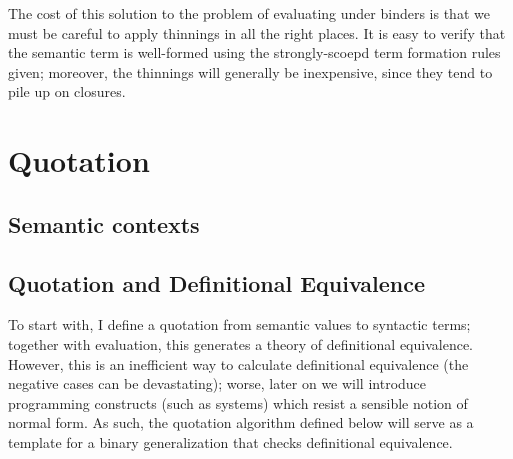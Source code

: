 \documentclass{article}
\newcommand\FmtKwd[1]{\mathsf{#1}}
\newcommand\DeclBox[1]{\framebox{$\displaystyle{}#1$}}
\newcommand\FmtTm[1]{{\color{Violet}#1}}
\newcommand\FmtVal[1]{{\color{Red}{#1}}}
\begin{document}
The cost of this solution to the problem of evaluating under binders
is that we must be careful to apply thinnings in all the right
places. It is easy to verify that the semantic term is well-formed
using the strongly-scoepd term formation rules given; moreover, the
thinnings will generally be inexpensive, since they tend to pile up on
closures.


\section{Quotation}

\newcommand\QuoteCan[4]{
  \FmtVal{#1}\vDash\FmtVal{#2}\ni\FmtVal{#3}\Uparrow\FmtTm{#4}
}

\newcommand\QuoteNeu[4]{
  \FmtVal{#1}\vDash\FmtVal{#2}\Uparrow\FmtTm{#3}\in\FmtVal{#4}
}

\newcommand\SortCtx[1]{\FmtKwd{ctx}_{#1}}

\subsection{Semantic contexts}


\subsection{Quotation and Definitional Equivalence}

To start with, I define a quotation from semantic values to syntactic
terms; together with evaluation, this generates a theory of
definitional equivalence. However, this is an inefficient way to
calculate definitional equivalence (the negative cases can be
devastating); worse, later on we will introduce programming constructs
(such as systems) which resist a sensible notion of normal form. As
such, the quotation algorithm defined below will serve as a template
for a binary generalization that checks definitional equivalence.
\end{document}

